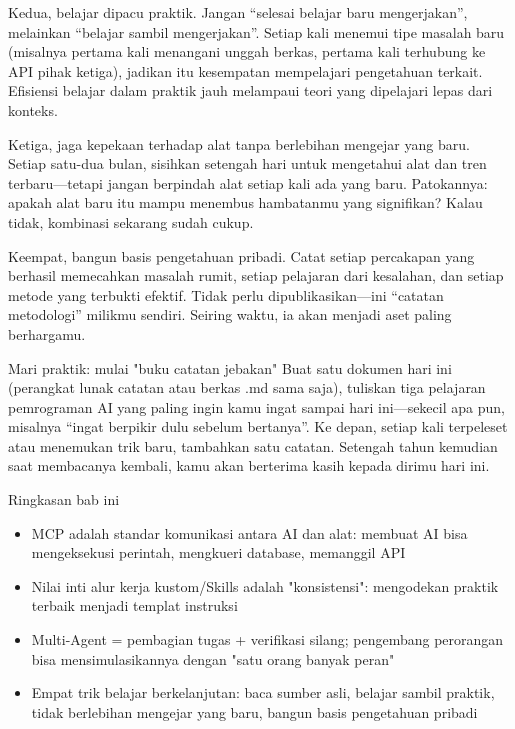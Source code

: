 Kedua, belajar dipacu praktik. Jangan “selesai belajar baru mengerjakan”, melainkan “belajar sambil mengerjakan”. Setiap kali menemui tipe masalah baru (misalnya pertama kali menangani unggah berkas, pertama kali terhubung ke API pihak ketiga), jadikan itu kesempatan mempelajari pengetahuan terkait. Efisiensi belajar dalam praktik jauh melampaui teori yang dipelajari lepas dari konteks.

Ketiga, jaga kepekaan terhadap alat tanpa berlebihan mengejar yang baru. Setiap satu-dua bulan, sisihkan setengah hari untuk mengetahui alat dan tren terbaru—tetapi jangan berpindah alat setiap kali ada yang baru. Patokannya: apakah alat baru itu mampu menembus hambatanmu yang signifikan? Kalau tidak, kombinasi sekarang sudah cukup.

Keempat, bangun basis pengetahuan pribadi. Catat setiap percakapan yang berhasil memecahkan masalah rumit, setiap pelajaran dari kesalahan, dan setiap metode yang terbukti efektif. Tidak perlu dipublikasikan—ini “catatan metodologi” milikmu sendiri. Seiring waktu, ia akan menjadi aset paling berhargamu.

\begin{tcbpractice}{Mari praktik: mulai "buku catatan jebakan"}
Buat satu dokumen hari ini (perangkat lunak catatan atau berkas .md sama saja), tuliskan tiga pelajaran pemrograman AI yang paling ingin kamu ingat sampai hari ini—sekecil apa pun, misalnya “ingat berpikir dulu sebelum bertanya”. Ke depan, setiap kali terpeleset atau menemukan trik baru, tambahkan satu catatan. Setengah tahun kemudian saat membacanya kembali, kamu akan berterima kasih kepada dirimu hari ini.

\end{tcbpractice}

\begin{tcbsummary}{Ringkasan bab ini}
\begin{itemize}
  \item MCP adalah standar komunikasi antara AI dan alat: membuat AI bisa mengeksekusi perintah, mengkueri database, memanggil API
  \item Nilai inti alur kerja kustom/Skills adalah "konsistensi": mengodekan praktik terbaik menjadi templat instruksi
  \item Multi-Agent = pembagian tugas + verifikasi silang; pengembang perorangan bisa mensimulasikannya dengan "satu orang banyak peran"
  \item Empat trik belajar berkelanjutan: baca sumber asli, belajar sambil praktik, tidak berlebihan mengejar yang baru, bangun basis pengetahuan pribadi
\end{itemize}

\end{tcbsummary}
